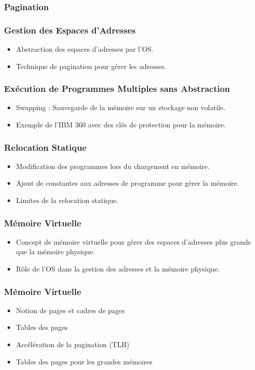 \documentclass[10pt]{beamer}
\begin{document}
\begin{frame}
    \frametitle{Pagination}
\end{frame}

\begin{frame}
    \frametitle{Gestion des Espaces d'Adresses}
    \begin{itemize}
        \item Abstraction des espaces d'adresses par l'OS.
        \item Technique de pagination pour gérer les adresses.
    \end{itemize}

\end{frame}
\begin{frame}
    \frametitle{Exécution de Programmes Multiples sans Abstraction}
    \begin{itemize}
        \item Swapping : Sauvegarde de la mémoire sur un stockage non volatile.
        \item Exemple de l'IBM 360 avec des clés de protection pour la mémoire.
    \end{itemize}
\end{frame}

\begin{frame}
    \frametitle{Relocation Statique}
    \begin{itemize}
        \item Modification des programmes lors du chargement en mémoire.
        \item Ajout de constantes aux adresses de programme pour gérer la
              mémoire.
        \item Limites de la relocation statique.
    \end{itemize}
\end{frame}

\begin{frame}
    \frametitle{Mémoire Virtuelle}
    \begin{itemize}
        \item Concept de mémoire virtuelle pour gérer des espaces d'adresses
              plus
              grands que la mémoire physique.
        \item Rôle de l'OS dans la gestion des adresses et la mémoire physique.
    \end{itemize}
\end{frame}

\begin{frame}
    \frametitle{Mémoire Virtuelle}
    \begin{itemize}
        \item Notion de pages et cadres de pages
        \item Tables des pages
        \item Accélération de la pagination (TLB)
        \item Tables des pages pour les grandes mémoires
    \end{itemize}
\end{frame}
\end{document}
